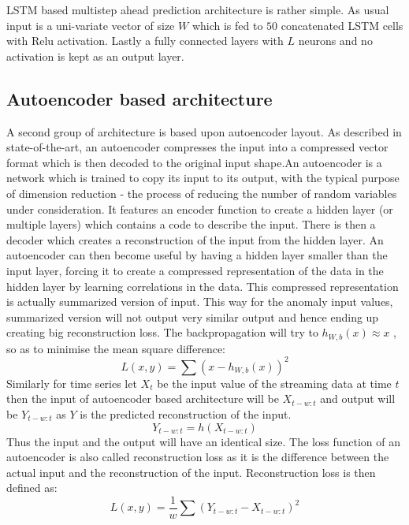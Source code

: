 \documentclass[12pt]{article}
\begin{document}
LSTM based multistep ahead prediction architecture is rather simple. As usual input is a uni-variate vector of size  $W$ which is fed to $50$ concatenated LSTM cells with Relu activation. Lastly a fully connected layers with $L$ neurons and no activation is kept as an output layer.
\subsection{Autoencoder based architecture}
A second group of architecture is based upon autoencoder layout. As described in state-of-the-art, an autoencoder compresses the input into a compressed vector format which is then decoded to the original input shape.An autoencoder is a network which is trained to copy its input to its output, with the typical purpose of dimension reduction - the process of reducing the number of random variables under consideration. It features an encoder function to create a hidden layer (or multiple layers) which contains a code to describe the input. There is then a decoder which creates a reconstruction of the input from the hidden layer. An autoencoder can then become useful by having a hidden layer smaller than the input layer, forcing it to create a compressed representation of the data in the hidden layer by learning correlations in the data. This compressed representation is actually summarized version of input. This way for the anomaly input values, summarized version will not output very similar output and hence ending up creating big reconstruction loss.
The backpropagation will try to  $h_{W,b}(x) \approx x$ , so as to minimise the mean square difference:
\begin{equation}
L(x,y) = \sum(x-h_{W,b}(x))^2
\end{equation}
Similarly for time series let $X_t$ be the input value of the streaming data at time $t$ then the input of autoencoder based architecture will be $X_{t-w:t}$ and output will be $Y_{t-w:t}$ as $Y$ is the predicted reconstruction of the input. 
\begin{equation}
Y_{t-w:t} = h(X_{t-w:t})
\end{equation}
Thus the input and the output will have an identical size. The loss function of an autoencoder is also called reconstruction loss as it is the difference between the actual input and the reconstruction of the input. Reconstruction loss is then defined as:
\begin{equation}
L(x,y) = \frac{1}{w}\sum(Y_{t-w:t}-X_{t-w:t})^2
\end{equation}
\end{document}
